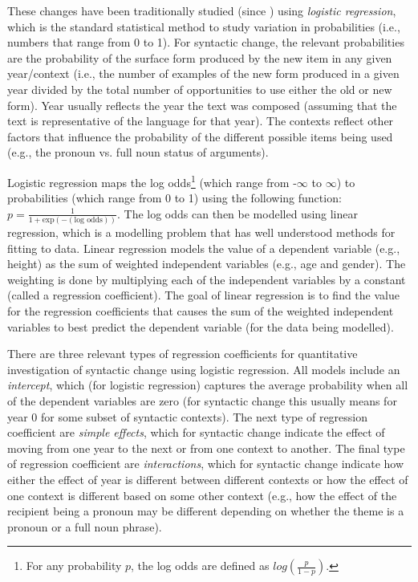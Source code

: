 	These changes have been traditionally studied (since \citealt{Kroch.1989}) using \textit{logistic regression}, which is the standard statistical method to study variation in probabilities (i.e., numbers that range from 0 to 1). For syntactic change, the relevant probabilities are the probability of the surface form produced by the new item in any given year/context (i.e., the number of examples of the new form produced in a given year divided by the total number of opportunities to use either the old or new form). Year usually reflects the year the text was composed (assuming that the text is representative of the language for that year). The contexts reflect other factors that influence the probability of the different possible items being used (e.g., the pronoun vs. full noun status of arguments).

	Logistic regression maps the log odds\footnote{For any probability $p$, the log odds are defined as $log(\frac{p}{1-p})$.} (which range from -$\infty$ to $\infty$) to probabilities (which range from 0 to 1) using the following function: $p=\frac{1}{1+\text{exp}(-(\text{log odds}))}$. The log odds can then be modelled using linear regression, which is a modelling problem that has well understood methods for fitting to data. Linear regression models the value of a dependent variable (e.g., height) as the sum of weighted independent variables (e.g., age and gender). The weighting is done by multiplying each of the independent variables by a constant (called a regression coefficient). The goal of linear regression is to find the value for the regression coefficients that causes the sum of the weighted independent variables to best predict the dependent variable (for the data being modelled).

	There are three relevant types of regression coefficients for quantitative investigation of syntactic change using logistic regression. All models include an \textit{intercept}, which (for logistic regression) captures the average probability when all of the dependent variables are zero (for syntactic change this usually means for year 0 for some subset of syntactic contexts). The next type of regression coefficient are \textit{simple effects}, which for syntactic change indicate the effect of moving from one year to the next or from one context to another. The final type of regression coefficient are \textit{interactions}, which for syntactic change indicate how either the effect of year is different between different contexts or how the effect of one context is different based on some other context (e.g., how the effect of the recipient being a pronoun may be different depending on whether the theme is a pronoun or a full noun phrase).

